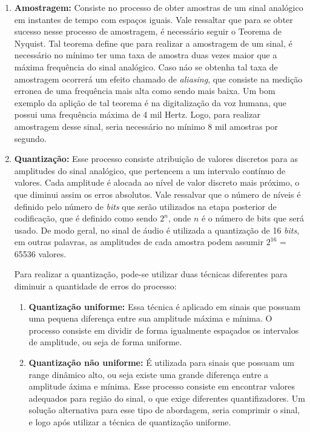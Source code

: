 \documentclass[a4paper,12pt,twoside,openright]{report}
\begin{document}
\begin{enumerate}
	\item{} \textbf{Amostragem:} Consiste no processo de obter amostras de um sinal anal\'{o}gico em instantes de tempo com espa{\c c}os iguais. Vale ressaltar que para se obter sucesso nesse processo de amostragem, \'{e} necess\'{a}rio seguir o Teorema de Nyquist. Tal teorema define que para realizar a amostragem de um sinal, \'{e} necess\'{a}rio no m\'{i}nimo ter uma taxa de amostra duas vezes maior que a m\'{a}xima frequ\^{e}ncia do sinal anal\'{o}gico. Caso n\'{a}o se obtenha tal taxa de amostragem ocorrer\'{a} um efeito chamado de \textit{aliasing}, que consiste na medi{\c c}\~{a}o erronea de uma frequ\^{e}ncia mais alta como sendo mais baixa. Um bom exemplo da apli{\c c}\~{a}o de tal teorema \'{e} na digitaliza{\c c}\~{a}o da voz humana, que possui uma frequ\^{e}ncia m\'{a}xima de 4 mil Hertz. Logo, para realizar amostragem desse sinal, seria necess\'{a}rio no m\'{i}nimo 8 mil amostras por segundo.
	\item{} \textbf{Quantiza{\c c}\~{a}o:} Esse processo consiste atribui{\c c}\~{a}o de valores discretos para as amplitudes do sinal anal\'{o}gico, que pertencem a um intervalo cont\'{i}nuo de valores. Cada amplitude \'{e} alocada ao n\'{i}vel de valor discreto mais pr\'{o}ximo, o que diminui assim os erros absolutos. Vale ressalvar que o n\'{u}mero de n\'{i}veis \'{e} definido pelo n\'{u}mero de \textit{bits} que ser\~{a}o utilizados na etapa posterior de codifica{\c c}\~{a}o, que \'{e} definido como sendo ${2^n}$, onde ${n}$ \'{e} o n\'{u}mero de bits que ser\'{a} usado. De modo geral, no sinal de \'{a}udio \'{e} utilizada a quantiza{\c c}\~{a}o de 16 \textit{bits}, em outras palavras, as amplitudes de cada amostra podem assumir ${2^{16}}$  = 65536 valores. 
	
	\par Para realizar a quantiza{\c c}\~{a}o, pode-se utilizar duas t\'{e}cnicas diferentes para diminuir a quantidade de erros do processo:
	
	\begin{enumerate}
		\item {} \textbf{Quantiza{\c c}\~{a}o uniforme:} Essa t\'{e}cnica \'{e} aplicado em sinais que possuam uma pequena diferen{\c c}a entre sua amplitude m\'{a}xima e m\'{i}nima. O processo consiste em dividir de forma igualmente espa{\c c}ados os intervalos de amplitude, ou seja de forma uniforme.
		\item {} \textbf{Quantiza{\c c}\~{a}o n\~{a}o uniforme:} \'{E} utilizada para sinais que possuam um range din\^{a}mico alto, ou seja existe uma grande diferen{\c c}a entre a amplitude \'{a}xima e m\'{i}nima. Esse processo consiste em encontrar valores adequados para regi\~{a}o do sinal, o que exige diferentes quantifizadores. Um solu{\c c}\~{a}o alternativa para esse tipo de abordagem, seria comprimir o sinal, e logo ap\'{o}s utilizar a t\'{e}cnica de quantiza{\c c}\~{a}o uniforme.
	\end{enumerate}
	

\end{enumerate}
\end{document}
